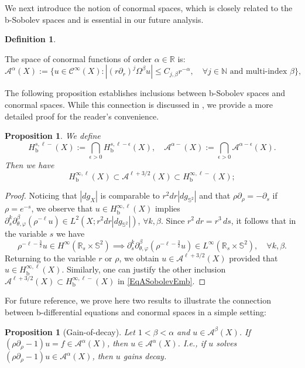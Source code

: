 \documentclass[10pt,a4paper,reqno]{amsart}
\newcommand{\CI}{\mathcal{C}^\infty}
\newcommand{\RR}{\mathbb{R}}
\newcommand{\A}{\mathcal{A}}
\newcommand{\Hb}{H_\text{b}}
\newcommand{\pa}{\partial}
\renewcommand{\S}{{\mathbb S}}
\newtheorem{proposition}[theorem]{Proposition}
\theoremstyle{definition}
\newtheorem{definition}[theorem]{Definition}
\theoremstyle{remark}
\numberwithin{equation}{section}
\newcommand{\eps}{\epsilon}
\newcommand{\N}{{\mathbb N}}
\newcommand{\cA}{\mathcal A}
\begin{document}
\noindent
We next introduce the notion of conormal spaces, which is closely related to the b-Sobolev spaces and is essential in our future analysis.

\begin{definition}\label{def:conormalspace} %

The space of conormal functions of order $\alpha \in \mathbb{R}$ is:
    $$\mathcal{A}^\alpha(X) := \{ u \in \CI(X) : |(r\partial_r)^j \Omega^\beta u| \leq C_{j,\beta} r^{-\alpha}, \quad \forall j \in \N \text{ and multi-index }\beta \},$$
\end{definition}

\noindent
The following proposition establishes inclusions between b-Sobolev spaces and conormal spaces. While this connection is discussed in \cite{Hin22}, we provide a more detailed proof for the reader's convenience.

\begin{proposition}
\label{prop:Sobolev embedding}
We define
\[
  \Hb^{s,\ell-}(X) := \bigcap_{\eps>0} \Hb^{s,\ell-\eps}(X),\quad
  \cA^{\alpha-}(X) := \bigcap_{\eps>0} \cA^{\alpha-\eps}(X).
\]
Then we have
\begin{equation}
\label{EqASobolevEmb}
  \Hb^{\infty,\ell}(X) \subset \cA^{\ell+3/2}(X) \subset \Hb^{\infty,\ell-}(X);
\end{equation}
\end{proposition}

\begin{proof}
Noticing that $|dg_X|$ is comparable to $r^2 dr |d g_{\S^2}|$ and that $\rho\pa_\rho = -\pa_s$ if $\rho = e^{-s}$, we observe that $u\in \Hb^{\infty,\ell}(X)$ implies $ \pa_s^k \pa_{\theta,\varphi}^\beta (\rho^{-\ell} u) \in L^2(X; r^2 dr |d g_{\S^2}|)$, $\forall k,\beta$. Since $r^2 \,dr = r^3 \,ds$, it follows that in the variable $s$ we have
\[
    \rho^{-\ell - \frac{3}{2}} u \in H^\infty (\RR_s\times\S^2) \implies \pa_s^k \pa_{\theta,\varphi}^\beta (\rho^{-\ell - \frac{3}{2}} u) \in L^\infty(\RR_s\times\S^2),\quad\forall k, \beta .
\]
Returning to the variable $r$ or $\rho$, we obtain $u\in \A^{\ell+3/2}(X)$ provided that $u\in\Hb^{\infty,\ell}(X)$. Similarly, one can justify the other inclusion $\A^{\ell+3/2}(X) \subset \Hb^{\infty,\ell-}(X)$ in \eqref{EqASobolevEmb}.
\end{proof}

For future reference, we prove here two results to illustrate the connection between b-differential equations and conormal spaces in a simple setting:
\begin{proposition}[Gain-of-decay]
\label{prop:bODE0}
Let $1<\beta<\alpha$ and $u\in\A^\beta(X)$. If $(\rho\pa_\rho - 1) u = f \in\A^\alpha(X)$, then $u\in\A^\alpha(X)$. I.e., if $u$ solves $(\rho\pa_\rho - 1) u \in\A^\alpha(X)$, then $u$ gains decay.
\end{proposition}
\end{document}

